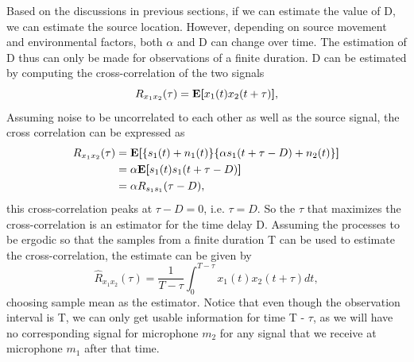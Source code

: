 Based on the discussions in previous sections, if we can estimate the value of D, we can estimate the source location. However, depending on source movement and environmental factors, both $\alpha$ and D can change over time. The estimation of D thus can only be made for observations of a finite duration. D can be estimated by computing the cross-correlation of the two signals
\begin{equation}
        R_{x_1x_2}(\tau) = \textbf{E[}x_1(t)x_2(t+\tau)\textbf], 
\end{equation}
Assuming noise to be uncorrelated to each other as well as the source signal, the cross correlation can be expressed as
\begin{equation}
    \begin{split}
        R_{x_1x_2}(\tau) &= \textbf{E[}\{s_1(t) + n_1(t)\}\{\alpha s_1(t+\tau - D) + n_2(t)\}\textbf] \\
                         &= \alpha\textbf{E[}s_1(t)s_1(t+\tau - D)\textbf] \\
                         &= \alpha R_{s_1s_1}(\tau - D),
    \end{split}
    \label{Eq:crosscorr}
\end{equation}
this cross-correlation peaks at $\tau - D = 0$, i.e. $\tau = D$. So the $\tau$ that maximizes the cross-correlation is an estimator for the time delay D. Assuming the processes to be ergodic so that the samples from a finite duration T can be used to estimate the cross-correlation, the estimate can be given by
\begin{equation}
    \hat{R}_{x_1 x_2}(\tau) = \frac{1}{T-\tau}\int_{0}^{T-\tau}x_1(t)x_2(t+\tau)dt,
\end{equation}
choosing sample mean as the estimator. Notice that even though the observation interval is T, we can only get usable information for time T - $\tau$, as we will have no corresponding signal for microphone $m_2$ for any signal that we receive at microphone $m_1$ after that time.


